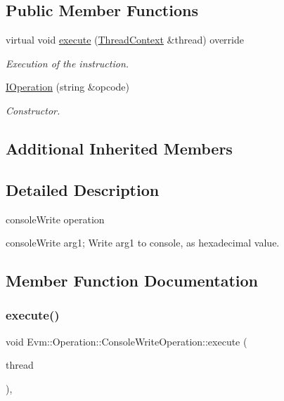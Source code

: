 \subsection*{Public Member Functions}
\begin{DoxyCompactItemize}
\item 
virtual void \mbox{\hyperlink{struct_evm_1_1_operation_1_1_console_write_operation_a5dc059cb2b6faacc3dd1b477eec645e1}{execute}} (\mbox{\hyperlink{struct_evm_1_1_thread_context}{Thread\+Context}} \&thread) override
\begin{DoxyCompactList}\small\item\em Execution of the instruction. \end{DoxyCompactList}\item 
\mbox{\hyperlink{struct_evm_1_1_operation_1_1_console_write_operation_a65e98ee1b1679e12c1d1dd000ebfe937}{I\+Operation}} (string \&opcode)
\begin{DoxyCompactList}\small\item\em Constructor. \end{DoxyCompactList}\end{DoxyCompactItemize}
\subsection*{Additional Inherited Members}


\subsection{Detailed Description}
console\+Write operation 

console\+Write arg1; Write arg1 to console, as hexadecimal value. 

\subsection{Member Function Documentation}
\mbox{\label{struct_evm_1_1_operation_1_1_console_write_operation_a5dc059cb2b6faacc3dd1b477eec645e1}} 
\subsubsection{\texorpdfstring{execute()}{execute()}}
{\footnotesize\ttfamily void Evm\+::\+Operation\+::\+Console\+Write\+Operation\+::execute (\begin{DoxyParamCaption}\item[{\mbox{\hyperlink{struct_evm_1_1_thread_context}{Thread\+Context}} \&}]{thread }\end{DoxyParamCaption})\hspace{0.3cm}{\ttfamily [override]}, {\ttfamily [virtual]}}



